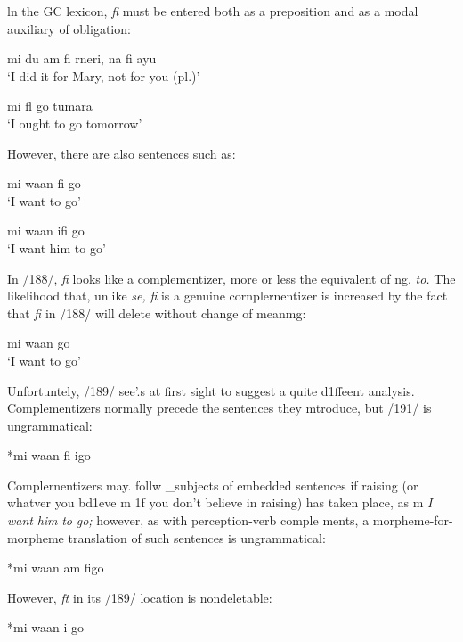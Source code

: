 ln the GC lexicon, \textit{fi} must be entered both as a preposition and as a modal auxiliary of obligation:

\ea\label{ex:2:186}
   mi du am fi rneri, na fi ayu\\
\glt `I did it for Mary, not for you (pl.)'
\z



\ea\label{ex:2:187}
  mi fl go tumara\\
\glt `I ought to go tomorrow'
\z



However, there are also sentences such as:

\ea\label{ex:2:188}
 mi waan fi go\\
\glt `I want to go'
\z



\ea\label{ex:2:189}
 mi waan ifi go\\
\glt `I want him to go'
\z



In /188/, \textit{fi} looks like a complementizer, more or less the equivalent of ng. \textit{to.} The likelihood that, unlike \textit{se,} \textit{fi} is a genuine cornplernentizer
is increased by the fact that \textit{fi }in /188/ will delete without change of meanmg:

\ea\label{ex:2:190}
 mi waan go \\
\glt `I want to go'
\z



Unfortuntely, /189/ see'.{\textquotedbl}s at first sight to suggest a quite d1ffeent analysis. Complementizers normally precede the sentences they mtroduce, but /191/ is ungrammatical:

\ea\label{ex:2:191}
 *mi waan fi igo
\z

Complernentizers may. follw \_subjects of embedded sentences if raising (or whatver you bd1eve m 1f you don't believe in raising) has taken place, as m \textit{I} \textit{want} \textit{him} \textit{to} \textit{go;} however, as with perception-verb comple%
ments, a morpheme-for-morpheme translation of such sentences is ungrammatical:

\ea\label{ex:2:192}
 *mi waan am figo
\glt
\z

However, \textit{ft} in its /189/ location is nondeletable:

\ea\label{ex:2:193}
 *mi waan i go
\z


